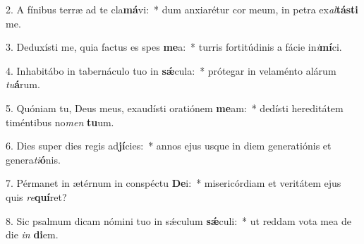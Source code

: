2. A fínibus terræ ad te cla\textbf{má}vi:~*  dum anxiarétur cor meum, in petra ex\textit{al}\textbf{tás}\textbf{ti} me.\

3. Deduxísti me, quia factus es spes \textbf{me}a:~*  turris fortitúdinis a fácie in\textit{i}\textbf{mí}ci.\

4. Inhabitábo in tabernáculo tuo in \textbf{sǽ}cula:~*  prótegar in velaménto alárum \textit{tu}\textbf{á}rum.\

5. Quóniam tu, Deus meus, exaudísti oratiónem \textbf{me}am:~*  dedísti hereditátem timéntibus no\textit{men} \textbf{tu}um.\

6. Dies super dies regis ad\textbf{jí}cies:~*  annos ejus usque in diem generatiónis et genera\textit{ti}\textbf{ó}nis.\

7. Pérmanet in ætérnum in conspéctu \textbf{De}i:~*  misericórdiam et veritátem ejus quis \textit{re}\textbf{quí}ret?\

8. Sic psalmum dicam nómini tuo in sǽculum \textbf{sǽ}culi:~*  ut reddam vota mea de die \textit{in} \textbf{di}em.\

